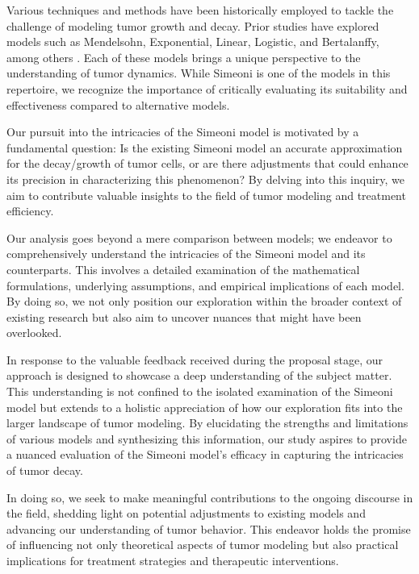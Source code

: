 \documentclass[11pt]{amsart}
\begin{document}
Various techniques and methods have been historically employed to tackle the challenge of modeling tumor growth and decay. Prior studies have explored models such as Mendelsohn, Exponential, Linear, Logistic, and Bertalanffy, among others \cite{Murphy_Hope_2016}. Each of these models brings a unique perspective to the understanding of tumor dynamics. While Simeoni is one of the models in this repertoire, we recognize the importance of critically evaluating its suitability and effectiveness compared to alternative models.

Our pursuit into the intricacies of the Simeoni model is motivated by a fundamental question: Is the existing Simeoni model an accurate approximation for the decay/growth of tumor cells, or are there adjustments that could enhance its precision in characterizing this phenomenon? By delving into this inquiry, we aim to contribute valuable insights to the field of tumor modeling and treatment efficiency.

Our analysis goes beyond a mere comparison between models; we endeavor to comprehensively understand the intricacies of the Simeoni model and its counterparts. This involves a detailed examination of the mathematical formulations, underlying assumptions, and empirical implications of each model. By doing so, we not only position our exploration within the broader context of existing research but also aim to uncover nuances that might have been overlooked.

In response to the valuable feedback received during the proposal stage, our approach is designed to showcase a deep understanding of the subject matter. This understanding is not confined to the isolated examination of the Simeoni model but extends to a holistic appreciation of how our exploration fits into the larger landscape of tumor modeling. By elucidating the strengths and limitations of various models and synthesizing this information, our study aspires to provide a nuanced evaluation of the Simeoni model's efficacy in capturing the intricacies of tumor decay.

In doing so, we seek to make meaningful contributions to the ongoing discourse in the field, shedding light on potential adjustments to existing models and advancing our understanding of tumor behavior. This endeavor holds the promise of influencing not only theoretical aspects of tumor modeling but also practical implications for treatment strategies and therapeutic interventions.


\end{document}
